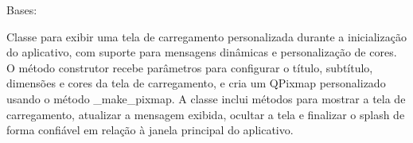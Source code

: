 \documentclass[letterpaper,10pt,english]{sphinxmanual}
\begin{document}
\begin{fulllineitems}
\label{\detokenize{api/loading_screen:loading_screen.LoadingScreen}}
\pysigstartsignatures
\pysiglinewithargsret
{}
{\sphinxparamcomma {}\sphinxparamcomma {}\sphinxparamcomma {}\sphinxparamcomma {}\sphinxparamcomma {}\sphinxparamcomma {}\sphinxparamcomma {}\sphinxparamcomma {}}
{}
\pysigstopsignatures
\sphinxAtStartPar
Bases: 

\sphinxAtStartPar
Classe para exibir uma tela de carregamento personalizada durante a inicialização do aplicativo, com suporte para mensagens dinâmicas e personalização de cores. O método construtor recebe parâmetros para configurar o título, subtítulo, dimensões e cores da tela de carregamento, e cria um QPixmap personalizado usando o método \_make\_pixmap. A classe inclui métodos para mostrar a tela de carregamento, atualizar a mensagem exibida, ocultar a tela e finalizar o splash de forma confiável em relação à janela principal do aplicativo.


\end{fulllineitems}
\end{document}
